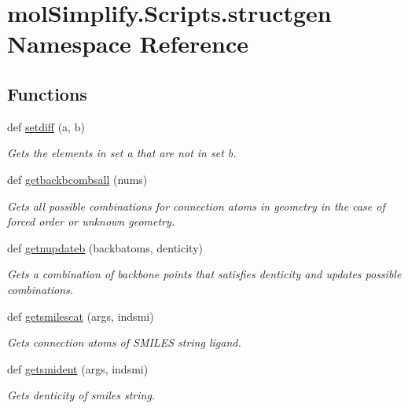 \hypertarget{namespacemolSimplify_1_1Scripts_1_1structgen}{}\section{mol\+Simplify.\+Scripts.\+structgen Namespace Reference}
\label{namespacemolSimplify_1_1Scripts_1_1structgen}
\subsection*{Functions}
\begin{DoxyCompactItemize}
\item 
def \hyperlink{namespacemolSimplify_1_1Scripts_1_1structgen_a5913017e9413ea0a08b21faa12d34600}{setdiff} (a, b)
\begin{DoxyCompactList}\small\item\em Gets the elements in set a that are not in set b. \end{DoxyCompactList}\item 
def \hyperlink{namespacemolSimplify_1_1Scripts_1_1structgen_aeab6e4135b3aea86dfde6a2d8b81069a}{getbackbcombsall} (nums)
\begin{DoxyCompactList}\small\item\em Gets all possible combinations for connection atoms in geometry in the case of forced order or unknown geometry. \end{DoxyCompactList}\item 
def \hyperlink{namespacemolSimplify_1_1Scripts_1_1structgen_aa4efa4ec6b344b172d90a999b7a81ac7}{getnupdateb} (backbatoms, denticity)
\begin{DoxyCompactList}\small\item\em Gets a combination of backbone points that satisfies denticity and updates possible combinations. \end{DoxyCompactList}\item 
def \hyperlink{namespacemolSimplify_1_1Scripts_1_1structgen_a58eaeb979acdfe86a20f086609495725}{getsmilescat} (args, indsmi)
\begin{DoxyCompactList}\small\item\em Gets connection atoms of S\+M\+I\+L\+ES string ligand. \end{DoxyCompactList}\item 
def \hyperlink{namespacemolSimplify_1_1Scripts_1_1structgen_ad59becac42b9cc602dfb5ed08452922b}{getsmident} (args, indsmi)
\begin{DoxyCompactList}\small\item\em Gets denticity of smiles string. \end{DoxyCompactList}\item 

\end{DoxyCompactItemize}
